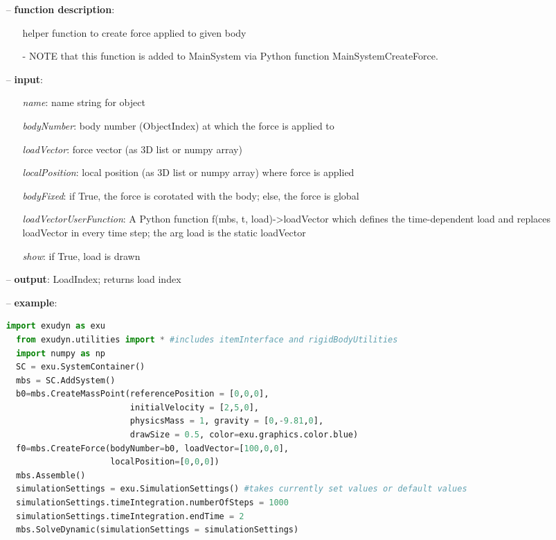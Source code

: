 \begin{itemize}[leftmargin=0.7cm]
\item[--]
{\bf function description}: \vspace{-6pt}
\begin{itemize}[leftmargin=1.2cm]
\setlength{\itemindent}{-0.7cm}
\item[]helper function to create force applied to given body
\item[]- NOTE that this function is added to MainSystem via Python function MainSystemCreateForce.
\end{itemize}
\item[--]
{\bf input}: \vspace{-6pt}
\begin{itemize}[leftmargin=1.2cm]
\setlength{\itemindent}{-0.7cm}
\item[]{\it name}: name string for object
\item[]{\it bodyNumber}: body number (ObjectIndex) at which the force is applied to
\item[]{\it loadVector}: force vector (as 3D list or numpy array)
\item[]{\it localPosition}: local position (as 3D list or numpy array) where force is applied
\item[]{\it bodyFixed}: if True, the force is corotated with the body; else, the force is global
\item[]{\it loadVectorUserFunction}: A Python function f(mbs, t, load)->loadVector which defines the time-dependent load and replaces loadVector in every time step; the arg load is the static loadVector
\item[]{\it show}: if True, load is drawn
\end{itemize}
\item[--]
{\bf output}: LoadIndex; returns load index
\item[--]
{\bf example}: \vspace{-12pt}\ei\begin{lstlisting}[language=Python, xleftmargin=36pt]
  import exudyn as exu
  from exudyn.utilities import * #includes itemInterface and rigidBodyUtilities
  import numpy as np
  SC = exu.SystemContainer()
  mbs = SC.AddSystem()
  b0=mbs.CreateMassPoint(referencePosition = [0,0,0],
                         initialVelocity = [2,5,0],
                         physicsMass = 1, gravity = [0,-9.81,0],
                         drawSize = 0.5, color=exu.graphics.color.blue)
  f0=mbs.CreateForce(bodyNumber=b0, loadVector=[100,0,0],
                     localPosition=[0,0,0])
  mbs.Assemble()
  simulationSettings = exu.SimulationSettings() #takes currently set values or default values
  simulationSettings.timeIntegration.numberOfSteps = 1000
  simulationSettings.timeIntegration.endTime = 2
  mbs.SolveDynamic(simulationSettings = simulationSettings)
\end{lstlisting}\vspace{-24pt}\bi\item[]\vspace{-24pt}\vspace{12pt}\end{itemize}
%

